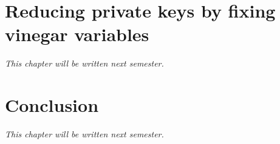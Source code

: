 \documentclass{ufsctex/ufsctex}
\begin{document}





\chapter{Reducing private keys by fixing vinegar variables}

\textit{This chapter will be written next semester.}

\chapter{Conclusion}

\textit{This chapter will be written next semester.}



\end{document}
